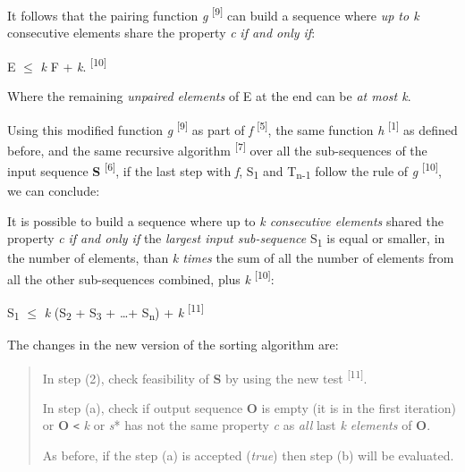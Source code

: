 \documentclass[12pt]{article}
\begin{document}
It follows that the pairing function \textit{g} \textsuperscript{[9]} can build 
a sequence where \textit{up to k} consecutive elements share the property \textit{c} 
\textit{if and only if}: 

\begin{center}
\textbar{}E\textbar{} $\leq$ \textit{k} \textperiodcentered{} \textbar{}F\textbar{} + \textit{k}. \textsuperscript{[10]}
\end{center}

Where the remaining \textit{unpaired elements} of E at the end can be \textit{at most k}.

Using this modified function \textit{g} \textsuperscript{[9]} as part of \textit{f} 
\textsuperscript{[5]}, the same function \textit{h} \textsuperscript{[1]} as defined 
before, and the same recursive algorithm \textsuperscript{[7]} over all the sub-sequences of the input sequence \textbf{S} \textsuperscript{[6]}, if the last step with \textit{f}, S\textsubscript{1} 
and T\textsubscript{n-1} follow the rule of \textit{g} \textsuperscript{[10]}, we 
can conclude:

It is possible to build a sequence where up to \textit{k consecutive elements} 
shared the property \textit{c} \textit{if and only if} the \textit{largest input 
sub-sequence} S\textsubscript{1} is equal or smaller, in the number of elements, than 
\textit{k times} the sum of all the number of elements from all the other sub-sequences 
combined, plus \textit{k} \textsuperscript{[10]}:

\begin{center}
\textbar{}S\textsubscript{1}\textbar{} $\leq$ \textit{k} \textperiodcentered{} (\textbar{}S\textsubscript{2}\textbar{} 
+ \textbar{}S\textsubscript{3}\textbar{} + \ldots + \textbar{}S\textsubscript{n}\textbar{}) 
+ \textit{k} \textsuperscript{[11]}
\end{center}

The changes in the new version of the sorting algorithm are:

\begin{quote}
In step (2), check feasibility of \textbf{S} by using the new test \textsuperscript{[11]}.

In step (a), check if output sequence \textbf{O} is empty (it is in the first iteration) 
or \textbar{}\textbf{O}\textbar{} \texttt{<} \textit{k} or \textit{s}* has not 
the same property \textit{c} as \textit{all} last \textit{k elements} 
of \textbf{O}.

As before, if the step (a) is accepted (\textit{true}) then step (b) will be evaluated.
\end{quote}
\end{document}
